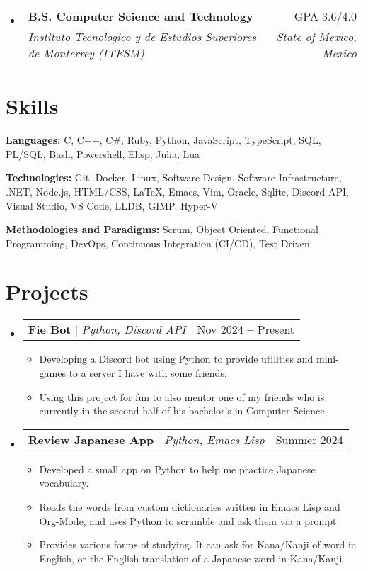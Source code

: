 \documentclass[letterpaper, 11pt]{article}
\makeatletter
\newcommand{\resumeSchoolHeading}[4]{
  \vspace{-5pt}\item
  \begin{tabular*}{0.97\textwidth}[t]{l@{\extracolsep{\fill}}r}
    \textbf{#1} & #2 \\
    \textit{\small#3} & \textit{\small#4}
  \end{tabular*}\vspace{-5pt}
}
\newcommand{\resumeProjectHeading}[3]{
  \vspace{-2pt}\item
  \begin{tabular*}{0.97\textwidth}{l@{\extracolsep{\fill}}r}
    \textbf{#1} $|$ \small\textit{#2} & #3
  \end{tabular*}\vspace{-9pt}
}
\newcommand{\resumeItem}[1]{
  \item\small{
    {#1 \vspace{-2pt}}
  }
}
\newcommand{\resumeSkillList}[2]{
  \textbf{#1:}{ #2 } \\ \vspace{1.5pt}
}
\makeatother
\begin{document}
\begin{itemize}[leftmargin=0.15in, label={}]
  \resumeSchoolHeading
      {B.S. Computer Science and Technology}{GPA 3.6/4.0}
      {Instituto Tecnologico y de Estudios Superiores de Monterrey (ITESM)}{State of Mexico, Mexico}
\end{itemize}


\section{Skills}
\vspace{1pt}

\begin{itemize}[leftmargin=0.15in, label={}]
  \small{\item{
    \resumeSkillList
      {Languages}{C, C++, C\#, Ruby, Python, JavaScript, TypeScript, SQL, PL/SQL, Bash, Powershell, Elisp, Julia, Lua}
    \resumeSkillList
      {Technologies}{Git, Docker, Linux, Software Design, Software Infrastructure, .NET, Node.js, HTML/CSS, LaTeX, Emacs, Vim, Oracle, Sqlite, Discord API, Visual Studio, VS Code, LLDB, GIMP, Hyper-V}
    \resumeSkillList
      {Methodologies and Paradigms}{Scrum, Object Oriented, Functional Programming, DevOps, Continuous Integration (CI/CD), Test Driven}
  }}
\end{itemize}


\section{Projects}
\vspace{1pt}
\begin{itemize}[leftmargin=0.15in, label={}]

  \resumeProjectHeading
    {Fie Bot}{Python, Discord API}{Nov 2024 \textbf{--} Present}

  \begin{itemize}
    \resumeItem{Developing a Discord bot using Python to provide utilities and mini-games to a server I have with some friends.}
    \resumeItem{Using this project for fun to also mentor one of my friends who is currently in the second half of his bachelor's in Computer Science.}
  \end{itemize}\vspace{-5pt}

  \resumeProjectHeading
    {Review Japanese App}{Python, Emacs Lisp}{Summer 2024}

    \begin{itemize}
      \resumeItem{Developed a small app on Python to help me practice Japanese vocabulary.}
      \resumeItem{Reads the words from custom dictionaries written in Emacs Lisp and Org-Mode, and uses Python to scramble and ask them via a prompt.}
      \resumeItem{Provides various forms of studying. It can ask for Kana/Kanji of word in English, or the English translation of a Japanese word in Kana/Kanji.}
    \end{itemize}\vspace{-5pt}
\end{itemize}
\end{document}
